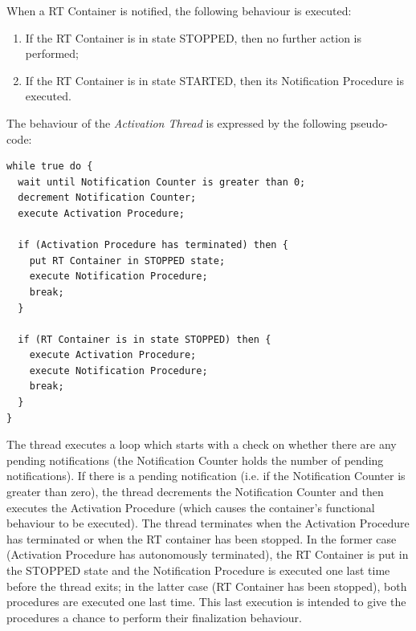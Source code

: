 When a RT Container is notified, the following behaviour is executed:

\begin{enumerate} 
\item If the RT Container is in state STOPPED, then no further action is performed;
\item If the RT Container is in state STARTED, then its Notification Procedure is executed.
\end{enumerate}

The behaviour of the \emph{Activation Thread} is expressed by the following pseudo-code:

\begin{lstlisting}
while true do {
  wait until Notification Counter is greater than 0;
  decrement Notification Counter;
  execute Activation Procedure;
  
  if (Activation Procedure has terminated) then {
    put RT Container in STOPPED state;
    execute Notification Procedure;
    break;
  }

  if (RT Container is in state STOPPED) then {
    execute Activation Procedure;
    execute Notification Procedure;
    break;
  }
}
\end{lstlisting}

The thread executes a loop which starts with a check on whether there are any pending notifications (the Notification Counter holds the number of pending notifications). If there is a pending notification (i.e. if the Notification Counter is greater than zero), the thread decrements the Notification Counter and then executes the Activation Procedure (which causes the container's functional behaviour to be executed). The thread terminates when the Activation Procedure has terminated or when the RT container has been stopped. In the former case (Activation Procedure has autonomously terminated), the RT Container is put in the STOPPED state and the Notification Procedure is executed one last time before the thread exits; in the latter case (RT Container has been stopped), both procedures are executed one last time. This last execution is intended to give the procedures a chance to perform their finalization behaviour.

